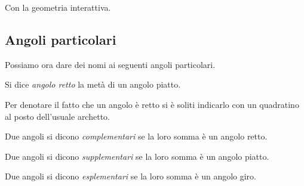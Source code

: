 \ifcoding
Con la geometria interattiva.


\fi

\subsection{Angoli particolari}

Possiamo ora dare dei nomi ai seguenti angoli particolari.

\begin{definizione}
Si dice \emph{angolo retto} la metà di un angolo piatto.
\end{definizione}

Per denotare il fatto che un angolo è retto si è soliti indicarlo con 
un quadratino al posto dell'usuale archetto.

\begin{inaccessibleblock}
 \begin{figure}[htb]
\begin{center}\end{center}
\end{figure}
\end{inaccessibleblock}

\begin{definizione}
Due angoli si dicono \emph{complementari} se la loro somma è un 
angolo retto.
\end{definizione}

\begin{definizione}
Due angoli si dicono \emph{supplementari} se la loro somma è un 
angolo piatto.
\end{definizione}

\begin{definizione}
Due angoli si dicono \emph{esplementari} se la loro somma è un angolo 
giro.
\end{definizione}


